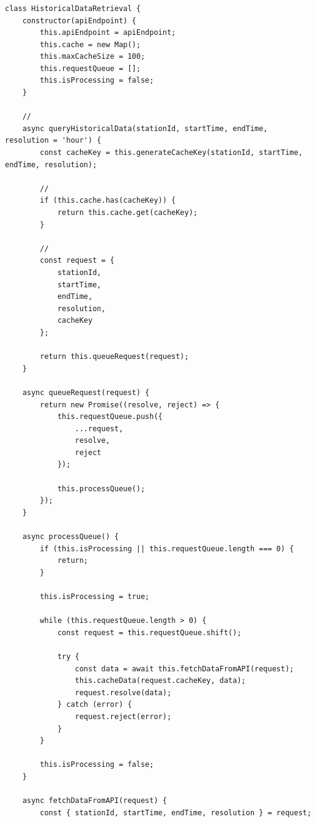 \hypertarget{section-174}{%
\subsubsection{}\label{section-174}}

\begin{lstlisting}[style=javascript]
class HistoricalDataRetrieval {
    constructor(apiEndpoint) {
        this.apiEndpoint = apiEndpoint;
        this.cache = new Map();
        this.maxCacheSize = 100;
        this.requestQueue = [];
        this.isProcessing = false;
    }
    
    // 
    async queryHistoricalData(stationId, startTime, endTime, resolution = 'hour') {
        const cacheKey = this.generateCacheKey(stationId, startTime, endTime, resolution);
        
        // 
        if (this.cache.has(cacheKey)) {
            return this.cache.get(cacheKey);
        }
        
        // 
        const request = {
            stationId,
            startTime,
            endTime,
            resolution,
            cacheKey
        };
        
        return this.queueRequest(request);
    }
    
    async queueRequest(request) {
        return new Promise((resolve, reject) => {
            this.requestQueue.push({
                ...request,
                resolve,
                reject
            });
            
            this.processQueue();
        });
    }
    
    async processQueue() {
        if (this.isProcessing || this.requestQueue.length === 0) {
            return;
        }
        
        this.isProcessing = true;
        
        while (this.requestQueue.length > 0) {
            const request = this.requestQueue.shift();
            
            try {
                const data = await this.fetchDataFromAPI(request);
                this.cacheData(request.cacheKey, data);
                request.resolve(data);
            } catch (error) {
                request.reject(error);
            }
        }
        
        this.isProcessing = false;
    }
    
    async fetchDataFromAPI(request) {
        const { stationId, startTime, endTime, resolution } = request;
        

\end{lstlisting}
